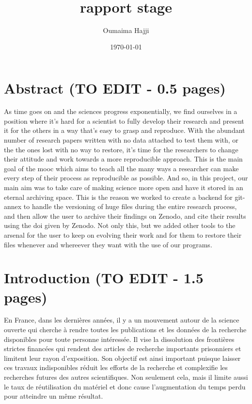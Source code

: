 \documentclass[11pt]{article}
\author{Oumaima Hajji}
\date{\today}
\title{rapport stage}
\begin{document}
\maketitle
\tableofcontents



\section{Abstract (TO EDIT - 0.5 pages)}
\label{sec:org3c07799}
As time goes on and the sciences progress exponentially, we find
ourselves in a position where it's hard for a scientist to fully
develop their research and present it for the others in a way that's
easy to grasp and reproduce. With the abundant number of research
papers written with no data attached to test them with, or the the
ones lost with no way to restore, it's time for the researchers to
change their attitude and work towards a more reproducible
approach. This is the main goal of the mooc which aims to teach all
the many ways a researcher can make every step of their process as
reproducible as possible. And so, in this project, our main aim was to
take care of making science more open and have it stored in an eternal
archiving space. This is the reason we worked to create a backend for
git-annex to handle the versioning of huge files during the entire
research process, and then allow the user to archive their findings on
Zenodo, and cite their results using the doi given by Zenodo. Not only
this, but we added other tools to the arsenal for the user to keep on
evolving their work and for them to restore their files whenever and
whereever they want with the use of our programs.  

\section{Introduction (TO EDIT - 1.5 pages)}
\label{sec:orge009df4}
En France, dans les dernières années, il y a un mouvement autour de la
science ouverte qui cherche à rendre toutes les publications et les
données de la recherche disponibles pour toute personne intéressée. Il
vise la dissolution des frontières strictes financées qui rendent des
articles de recherche importants prisonniers et limitent leur rayon
d'exposition. Son objectif est ainsi important puisque laisser ces
travaux indisponibles réduit les efforts de la recherche et complexifie
les recherches futures des autres scientifiques. Non seulement cela,
mais il limite aussi le taux de réutilisation du matériel et donc
cause l'augmentation du temps perdu pour atteindre un même résultat.
\end{document}
